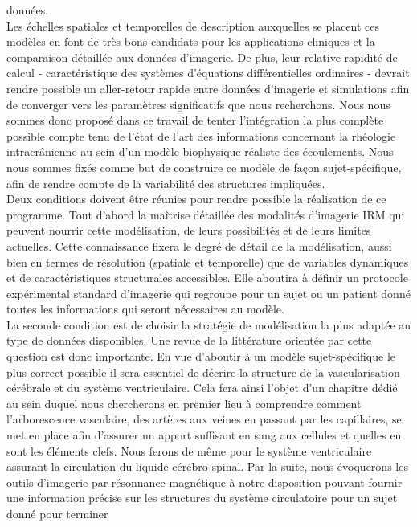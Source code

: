 données.\\
Les échelles spatiales et temporelles de description auxquelles se placent ces modèles en font de très bons candidats pour les applications cliniques et la comparaison détaillée aux données d'imagerie. De plus, leur relative rapidité de calcul - caractéristique des systèmes d'équations différentielles
ordinaires - devrait rendre possible un aller-retour rapide entre données d'imagerie et simulations afin de converger vers les paramètres significatifs que nous recherchons.
Nous nous sommes donc proposé dans ce travail de tenter l'intégration la plus complète possible compte tenu de l'état de l'art des informations concernant la rhéologie intracrânienne au sein 
d'un modèle biophysique réaliste des écoulements. Nous nous sommes fixés comme but de construire ce modèle de façon sujet-spécifique, afin de rendre compte de la variabilité des structures 
impliquées.\\
Deux conditions doivent être réunies pour rendre possible la réalisation de ce programme. Tout d'abord la maîtrise détaillée des modalités d'imagerie IRM qui peuvent nourrir cette modélisation, 
de leurs possibilités et de leurs limites actuelles. Cette connaissance fixera le degré de détail de la modélisation, aussi bien en termes de résolution (spatiale et temporelle) que de variables 
dynamiques et de caractéristiques structurales accessibles. Elle aboutira à définir un protocole expérimental standard d'imagerie qui regroupe pour un sujet ou un patient donné toutes les informations 
qui seront nécessaires au modèle.\\
La seconde condition est de choisir la stratégie de modélisation la plus adaptée au type de données disponibles. Une revue de la littérature orientée par cette question est donc importante.
En vue d’aboutir à un modèle sujet-spécifique le plus correct possible il sera essentiel de décrire la structure de la vascularisation cérébrale et du système ventriculaire. Cela fera ainsi l’objet 
d’un chapitre dédié au sein duquel nous chercherons en premier lieu à comprendre comment l’arborescence vasculaire, des artères aux veines en passant par les capillaires, se met en place afin d’assurer 
un apport suffisant en sang aux cellules et quelles en sont les éléments clefs. Nous ferons de même pour le système ventriculaire assurant la circulation du liquide cérébro-spinal. Par la suite, 
nous évoquerons les outils d’imagerie par résonnance magnétique à notre disposition pouvant fournir une information précise sur les structures du système circulatoire pour un sujet donné pour terminer 
